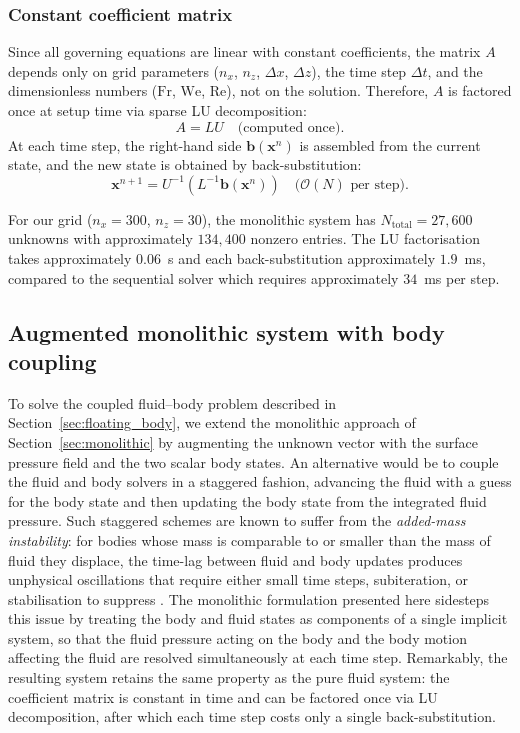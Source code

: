 \documentclass{article}
\newcommand{\Fr}{\mathrm{Fr}}
\newcommand{\We}{\mathrm{We}}
\newcommand{\Rey}{\mathrm{Re}}
\newcommand{\xx}{\mathbf{x}}
\newcommand{\bb}{\mathbf{b}}
\newcommand{\OO}{\mathcal{O}}
\begin{document}
\subsubsection{Constant coefficient matrix}

Since all governing equations are linear with constant coefficients, the matrix $A$ depends only on grid parameters ($n_x$, $n_z$, $\Delta x$, $\Delta z$), the time step $\Delta t$, and the dimensionless numbers ($\Fr$, $\We$, $\Rey$), not on the solution.
Therefore, $A$ is factored once at setup time via sparse LU decomposition:
\begin{equation}
    A = LU \quad \text{(computed once)}.
\end{equation}
At each time step, the right-hand side $\bb(\xx^n)$ is assembled from the current state, and the new state is obtained by back-substitution:
\begin{equation}
    \xx^{n+1} = U^{-1}(L^{-1}\bb(\xx^n)) \quad \text{($\OO(N)$ per step)}.
\end{equation}

For our grid ($n_x = 300$, $n_z = 30$), the monolithic system has $N_{\mathrm{total}} = 27{,}600$ unknowns with approximately $134{,}400$ nonzero entries.
The LU factorisation takes approximately $0.06$~s and each back-substitution approximately $1.9$~ms, compared to the sequential solver which requires approximately $34$~ms per step.

\subsection{Augmented monolithic system with body coupling}
\label{sec:augmented_monolithic}

To solve the coupled fluid--body problem described in Section~\ref{sec:floating_body}, we extend the monolithic approach of Section~\ref{sec:monolithic} by augmenting the unknown vector with the surface pressure field and the two scalar body states.
An alternative would be to couple the fluid and body solvers in a staggered fashion, advancing the fluid with a guess for the body state and then updating the body state from the integrated fluid pressure.
Such staggered schemes are known to suffer from the \emph{added-mass instability}: for bodies whose mass is comparable to or smaller than the mass of fluid they displace, the time-lag between fluid and body updates produces unphysical oscillations that require either small time steps, subiteration, or stabilisation to suppress \citep{HughesLiuZimmermann1981, DoneaEtAl2004}.
The monolithic formulation presented here sidesteps this issue by treating the body and fluid states as components of a single implicit system, so that the fluid pressure acting on the body and the body motion affecting the fluid are resolved simultaneously at each time step.
Remarkably, the resulting system retains the same property as the pure fluid system: the coefficient matrix is constant in time and can be factored once via LU decomposition, after which each time step costs only a single back-substitution.
\end{document}
